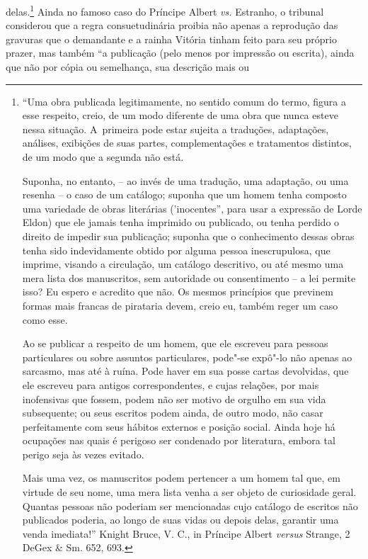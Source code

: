 delas.\footnote{``Uma obra publicada legitimamente, no sentido comum do
  termo, figura a esse respeito, creio, de um modo diferente de uma obra
  que nunca esteve nessa situação. A~primeira pode estar sujeita a
  traduções, adaptações, análises, exibições de suas partes,
  complementações e tratamentos distintos, de um modo que a segunda não
  está.

  Suponha, no entanto, -- ao invés de uma tradução, uma adaptação, ou
  uma resenha -- o caso de um catálogo; suponha que um homem tenha
  composto uma variedade de obras literárias ('inocentes'', para usar a
  expressão de Lorde Eldon) que ele jamais tenha imprimido ou publicado,
  ou tenha perdido o direito de impedir sua publicação; suponha que o
  conhecimento dessas obras tenha sido indevidamente obtido por alguma
  pessoa inescrupulosa, que imprime, visando a circulação, um catálogo
  descritivo, ou até mesmo uma mera lista dos manuscritos, sem
  autoridade ou consentimento -- a lei permite isso? Eu espero e
  acredito que não. Os mesmos princípios que previnem formas mais
  francas de pirataria devem, creio eu, também reger um caso como esse.

  Ao se publicar a respeito de um homem, que ele escreveu para pessoas
  particulares ou sobre assuntos particulares, pode"-se expô"-lo não
  apenas ao sarcasmo, mas até à ruína. Pode haver em sua posse cartas
  devolvidas, que ele escreveu para antigos correspondentes, e cujas
  relações, por mais inofensivas que fossem, podem não ser motivo de
  orgulho em sua vida subsequente; ou seus escritos podem ainda, de
  outro modo, não casar perfeitamente com seus hábitos externos e
  posição social. Ainda hoje há ocupações nas quais é perigoso ser
  condenado por literatura, embora tal perigo seja às vezes evitado.

  Mais uma vez, os manuscritos podem pertencer a um homem tal que, em
  virtude de seu nome, uma mera lista venha a ser objeto de curiosidade
  geral. Quantas pessoas não poderiam ser mencionadas cujo catálogo de
  escritos não publicados poderia, ao longo de suas vidas ou depois
  delas, garantir uma venda imediata!'' Knight Bruce, V. C., in Príncipe
  Albert \emph{versus} Strange, 2 DeGex \& Sm. 652, 693.} Ainda no
famoso caso do Príncipe Albert \emph{vs.} Estranho, o tribunal
considerou que a regra consuetudinária proibia não apenas a reprodução
das gravuras que o demandante e a rainha Vitória tinham feito para seu
próprio prazer, mas também ``a publicação (pelo menos por impressão ou
escrita), ainda que não por cópia ou semelhança, sua descrição mais ou
